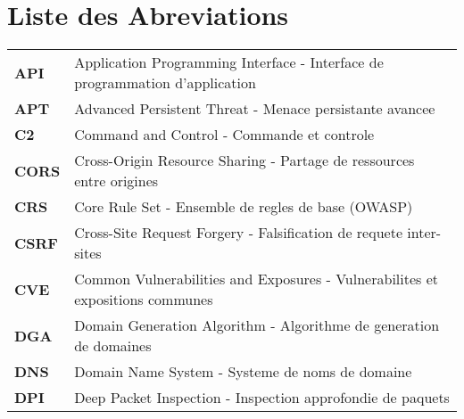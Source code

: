 \chapter*{Liste des Abreviations}

\vspace{1cm}

\begin{longtable}{p{3cm} p{12cm}}

    \textbf{API}     & Application Programming Interface - Interface de programmation d'application                           \\[0.3cm]

    \textbf{APT}     & Advanced Persistent Threat - Menace persistante avancee                                                \\[0.3cm]

    \textbf{C2}      & Command and Control - Commande et controle                                                             \\[0.3cm]

    \textbf{CORS}    & Cross-Origin Resource Sharing - Partage de ressources entre origines                                   \\[0.3cm]

    \textbf{CRS}     & Core Rule Set - Ensemble de regles de base (OWASP)                                                     \\[0.3cm]

    \textbf{CSRF}    & Cross-Site Request Forgery - Falsification de requete inter-sites                                      \\[0.3cm]

    \textbf{CVE}     & Common Vulnerabilities and Exposures - Vulnerabilites et expositions communes                          \\[0.3cm]

    \textbf{DGA}     & Domain Generation Algorithm - Algorithme de generation de domaines                                     \\[0.3cm]

    \textbf{DNS}     & Domain Name System - Systeme de noms de domaine                                                        \\[0.3cm]

    \textbf{DPI}     & Deep Packet Inspection - Inspection approfondie de paquets                                             \\[0.3cm]


\end{longtable}
